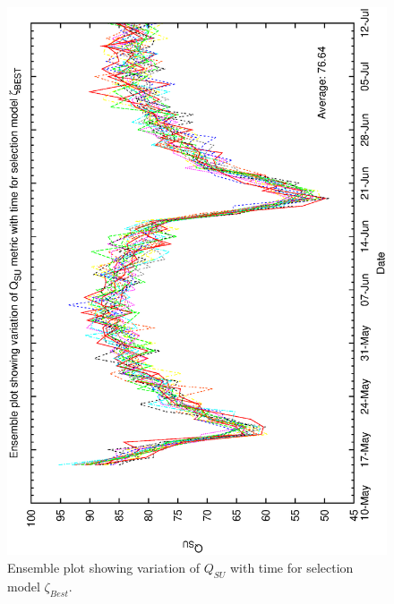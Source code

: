 \begin{figure}[h]
 \label{fig:ensemble_best}
\begin{center}
 \includegraphics[scale=0.5, angle=-90]{figures/best_ensemble.eps}
 \caption[Ensemble plot showing variation of $Q_{SU}$ with time for selection model $\zeta_{Best}$.] 
   {Ensemble plot showing variation of $Q_{SU}$ with time for selection model $\zeta_{Best}$.}
\end{center}
\end{figure}

